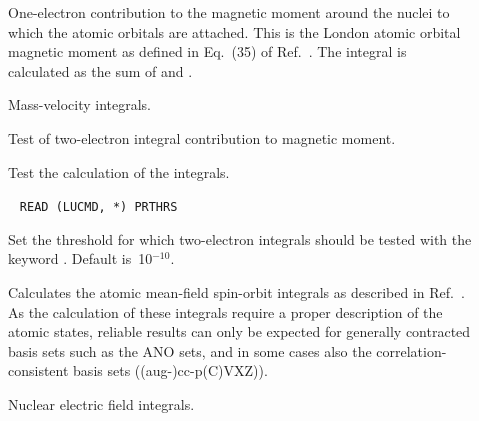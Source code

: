 \begin{description}
\item[] One-electron contribution to the magnetic
moment
around the nuclei to which the
atomic orbitals are attached. This is the London atomic
orbital
magnetic moment as defined in Eq.~(35) of
Ref.~\cite{krthklbpjhjajjcp99}. The integral is calculated as the sum of  and .


\item[] Mass-velocity integrals.


\item[] Test of two-electron integral contribution to
magnetic moment.

\item[] Test the calculation of the 
integrals.

\item[]\verb| |\newline
\verb|READ (LUCMD, *) PRTHRS|

Set the threshold for which two-electron integrals should be tested
 with the keyword . Default is~10$^{-10}$.

\item[] Calculates the atomic mean-field spin-orbit
 integrals as described in Ref.~\cite{bahcmmuwogcpl251}. As the
 calculation of these 
 integrals require a proper description of the atomic states, reliable
 results can only be expected for generally contracted basis sets such
 as the ANO sets, and in some cases also the correlation-consistent
 basis sets ((aug-)cc-p(C)VXZ)).

\item[] Nuclear electric field integrals.


\end{description}
